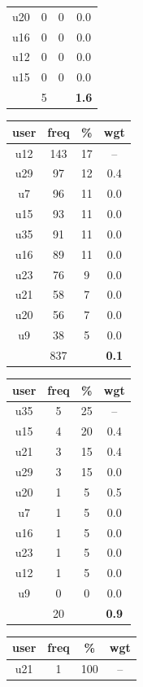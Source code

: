 \begin{table}
\begin{tabular}{ |c|c|c|c| }
	u20 & 0 & 0 & 0.0 \\
	u16 & 0 & 0 & 0.0 \\
	u12 & 0 & 0 & 0.0 \\
	u15 & 0 & 0 & 0.0 \\
	 & 5 & & \textbf{1.6} \\
	\hline
\end{tabular}
\begin{tabular}{ |c|c|c|c| }
	\hline
	\textbf{user} & \textbf{freq} & \textbf{\%} & \textbf{wgt} \\
	\hline
	u12 & 143 & 17 & -- \\
	u29 & 97 & 12 & 0.4 \\
	u7 & 96 & 11 & 0.0 \\
	u15 & 93 & 11 & 0.0 \\
	u35 & 91 & 11 & 0.0 \\
	u16 & 89 & 11 & 0.0 \\
	u23 & 76 & 9 & 0.0 \\
	u21 & 58 & 7 & 0.0 \\
	u20 & 56 & 7 & 0.0 \\
	u9 & 38 & 5 & 0.0 \\
	 & 837 & & \textbf{0.1} \\
	\hline
\end{tabular}
\begin{tabular}{ |c|c|c|c| }
	\hline
	\textbf{user} & \textbf{freq} & \textbf{\%} & \textbf{wgt} \\
	\hline
	u35 & 5 & 25 & -- \\
	u15 & 4 & 20 & 0.4 \\
	u21 & 3 & 15 & 0.4 \\
	u29 & 3 & 15 & 0.0 \\
	u20 & 1 & 5 & 0.5 \\
	u7 & 1 & 5 & 0.0 \\
	u16 & 1 & 5 & 0.0 \\
	u23 & 1 & 5 & 0.0 \\
	u12 & 1 & 5 & 0.0 \\
	u9 & 0 & 0 & 0.0 \\
	 & 20 & & \textbf{0.9} \\
	\hline
\end{tabular}
\begin{tabular}{ |c|c|c|c| }
	\hline
	\textbf{user} & \textbf{freq} & \textbf{\%} & \textbf{wgt} \\
	\hline
	u21 & 1 & 100 & -- \\

\end{tabular}
\end{table}
